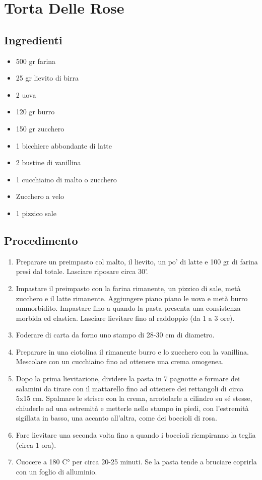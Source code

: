 \section{Torta Delle Rose}
\subsection{Ingredienti}
\begin{itemize}
\item 500 gr farina  
\item 25 gr lievito di birra  
\item 2 uova  
\item 120 gr burro  
\item 150 gr zucchero  
\item 1 bicchiere abbondante di latte  
\item 2 bustine di vanillina  
\item 1 cucchiaino di malto o zucchero  
\item Zucchero a velo  
\item 1 pizzico sale
\end{itemize}
\subsection{Procedimento}
\begin{enumerate}
\item  Preparare un preimpasto col malto, il lievito, un po' di latte e 100 gr di farina presi dal totale. Lasciare riposare circa 30'.  
\item  Impastare il preimpasto con la farina rimanente, un pizzico di sale, metà zucchero e il latte rimanente. Aggiungere piano piano le uova e metà burro ammorbidito. Impastare fino a quando la pasta presenta una consistenza morbida ed elastica. Lasciare lievitare fino al raddoppio (da 1 a 3 ore).   
\item  Foderare di carta da forno uno stampo di 28-30 cm di diametro.  
\item  Preparare in una ciotolina il rimanente burro e lo zucchero con la vanillina. Mescolare con un cucchiaino fino ad ottenere una crema omogenea.  
\item  Dopo la prima lievitazione, dividere la pasta in 7 pagnotte e formare dei salamini da tirare con il mattarello fino ad ottenere dei rettangoli di circa 5x15 cm. Spalmare le strisce con la crema, arrotolarle a cilindro su sé stesse, chiuderle ad una estremità e metterle nello stampo in piedi, con l'estremità sigillata in basso, una accanto all'altra, come dei boccioli di rosa.  
\item  Fare lievitare una seconda volta fino a quando i boccioli riempiranno la teglia (circa 1 ora).  
\item  Cuocere a 180 C° per circa 20-25 minuti. Se la pasta tende a bruciare coprirla con un foglio di alluminio.
\end{enumerate}
